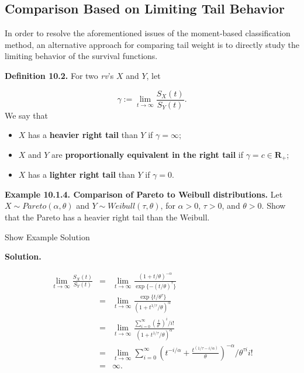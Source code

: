 \documentclass[]{book}
\providecommand{\tightlist}{%
  \setlength{\itemsep}{0pt}\setlength{\parskip}{0pt}}
\theoremstyle{definition}
\theoremstyle{definition}
\theoremstyle{definition}
\theoremstyle{remark}
\begin{document}
\subsection{Comparison Based on Limiting Tail
Behavior}\label{comparison-based-on-limiting-tail-behavior}

In order to resolve the aforementioned issues of the moment-based
classification method, an alternative approach for comparing tail weight
is to directly study the limiting behavior of the survival functions.

\textbf{Definition 10.2.} For two \emph{rv}'s \(X\) and \(Y\), let

\[
\gamma:=\lim_{t\rightarrow \infty}\frac{S_X(t)}{S_Y(t)}.
\] We say that

\begin{itemize}
\tightlist
\item
  \(X\) has a \textbf{heavier right tail} than \(Y\) if
  \(\gamma=\infty\);\\
\item
  \(X\) and \(Y\) are \textbf{proportionally equivalent in the right
  tail} if \(\gamma =c\in \mathbf{R}_+\);
\item
  \(X\) has a \textbf{lighter right tail} than \(Y\) if \(\gamma=0\).
\end{itemize}

\textbf{Example 10.1.4. Comparison of Pareto to Weibull distributions.}
Let \(X\sim Pareto(\alpha, \theta)\) and
\(Y\sim Weibull(\tau, \theta)\), for \(\alpha>0\), \(\tau>0\), and
\(\theta>0\). Show that the Pareto has a heavier right tail than the
Weibull.

Show Example Solution

\hypertarget{toggleExamplePortMgt.1.4}{}
\textbf{Solution.}

\begin{eqnarray*}
    \lim_{t\rightarrow \infty}\frac{S_X(t)}{S_Y(t)} &=& \lim_{t\rightarrow \infty}\frac{(1+t/\theta)^{-\alpha}}{\exp\{-(t/\theta)^{\tau}\}} \\
    &=& \lim_{t\rightarrow \infty}\frac{\exp\{t/\theta^{\tau} \}}{(1+t^{1/\tau}/\theta)^{\alpha}} \\
    &=& \lim_{t\rightarrow \infty}\frac{\sum_{i=0}^{\infty}\left(\frac{t}{\theta^{\tau}}\right)^{i}/i!}{(1+t^{1/\tau}/\theta)^{\alpha}}\\
    &=& \lim_{t\rightarrow \infty} \sum_{i=0}^{\infty} \left(t^{-i/\alpha}+\frac{t^{(1/\tau-i/\alpha)}}{\theta} \right)^{-\alpha}/\theta^{\tau i}i!\\
    &=& \infty.
\end{eqnarray*}
\end{document}
